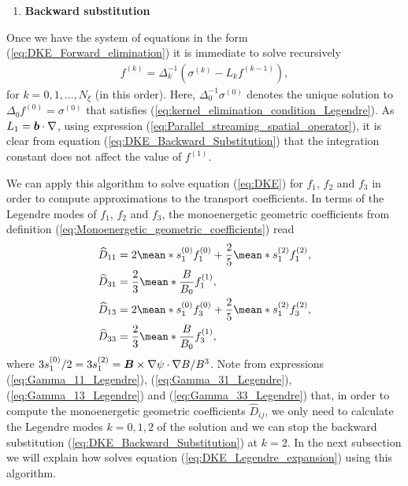   \begin{enumerate}[resume]
   \item \textbf{Backward substitution}
\end{enumerate}
   Once we have the system of equations in the form (\ref{eq:DKE_Forward_elimination}) it is immediate to solve recursively
   \begin{align}
   	f^{(k)} = 
   	\Delta_k^{-1}
   	\left( 
   	\sigma^{(k)} -  L_{k} f^{(k-1)} 
   	\right), 	\label{eq:DKE_Backward_Substitution}
   \end{align}
   for $k=0,1,...,N_\xi$ (in this order). Here, $\Delta_0^{-1} \sigma^{(0)}$ denotes the unique solution to $\Delta_0 f^{(0)} = \sigma^{(0)} $ that satisfies (\ref{eq:kernel_elimination_condition_Legendre}). As $L_1= \vb*{b}\cdot \nabla$, using expression (\ref{eq:Parallel_streaming_spatial_operator}), it is clear from equation (\ref{eq:DKE_Backward_Substitution}) that the integration constant does not affect the value of $f^{(1)}$.

 We can apply this algorithm to solve equation (\ref{eq:DKE}) for $f_1$, $f_2$ and $f_3$ in order to compute approximations to the transport coefficients. In terms of the Legendre modes of $f_1$, $f_2$ and $f_3$, the monoenergetic geometric coefficients from definition (\ref{eq:Monoenergetic_geometric_coefficients}) read
 \begin{align}
 	\widehat{D}_{11} & = 2\mean*{s_1^{(0)} f_1^{(0)}} + \frac{2}{5}\mean*{s_1^{(2)} f_1^{(2)}}, 
 	\label{eq:Gamma_11_Legendre}\\ 
 	\widehat{D}_{31} & = \frac{2}{3} \mean*{\frac{B}{B_0} f_1^{(1)}},\label{eq:Gamma_31_Legendre}\\ 
 	\widehat{D}_{13} & = 2\mean*{s_1^{(0)} f_3^{(0)}} + \frac{2}{5}\mean*{s_1^{(2)} f_3^{(2)}}, \label{eq:Gamma_13_Legendre}\\ 
 	\widehat{D}_{33} & =\frac{2}{3} \mean*{\frac{B}{B_0} f_3^{(1)}}, \label{eq:Gamma_33_Legendre}
 \end{align}
 where $3s_1^{(0)} /2= 3s_1^{(2)} = \vb*{B}\times\nabla\psi \cdot \nabla B / B^3$. Note  from expressions (\ref{eq:Gamma_11_Legendre}), (\ref{eq:Gamma_31_Legendre}), (\ref{eq:Gamma_13_Legendre}) and (\ref{eq:Gamma_33_Legendre}) that, in order to compute the monoenergetic geometric coefficients $\widehat{D}_{ij}$, we only need to calculate the Legendre modes $k=0,1,2$ of the solution and we can stop the backward substitution (\ref{eq:DKE_Backward_Substitution}) at $k=2$. In the next subsection we will explain how {\MONKES} solves equation (\ref{eq:DKE_Legendre_expansion}) using this algorithm.
 
